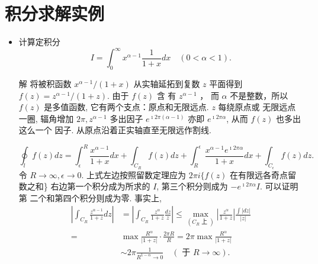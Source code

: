 \section{积分求解实例}

\begin{itemize}
    \item 计算定积分 
    $$
    I=\int_0^{\infty} x^{\alpha-1} \frac{1}{1+x} d x \quad(0<\alpha<1).
    $$

    解 将被积函数 $x^{\alpha-1} /(1+x)$ 从实轴延拓到复数 $z$ 平面得到 
    $f(z)=z^{\alpha-1} /(1+z)$. 由于 $f(z)$ 含 有 $z^{\alpha-1}$ ，
    而 $\alpha$ 不是整数，所以 $f(z)$ 是多值函数, 它有两个支点：原点和无限远点. 
    $z$ 每绕原点或 无限远点一圈, 辐角增加 $2 \pi, z^{\alpha-1}$ 多出因子 
    $e^{\imath 2 \pi(\alpha-1)}$ 亦即 $e^{\imath 2 \pi \alpha}$,
     从而 $f(z)$ 也多出这么一个 因子.
    从原点沿着正实轴直至无限远作割线.   
    
    $$
\oint_l f(z) d z=\int_{\epsilon}^R \frac{x^{\alpha-1}}{1+x} d x+\int_{C_R} f(z) d z+\int_R^{\epsilon} \frac{x^{\alpha-1} e^{\imath 2 \pi \alpha}}{1+x} d x+\int_{C_{\epsilon}} f(z) d z .
$$
令 $R \rightarrow \infty, \epsilon \rightarrow 0$.
 上式左边按照留数定理应为 $2 \pi i\{f(z)$ 在有限远各奇点留数之和\}
  右边第一个积分成为所求的 $I$, 第三个积分则成为 $-e^{\imath 2 \pi \alpha} I$. 
  可以证明第 二个和第四个积分则成为零. 事实上,
  $$
\begin{aligned}
\left|\int_{C_R} \frac{z^{\alpha-1}}{1+z} d z\right| & =\left|\int_{C_R} \frac{z^\alpha}{1+z} \frac{d z}{z}\right| \leqslant \max _{\left(C_R \text { 上 }\right)}\left|\frac{z^\alpha}{1+z}\right| \frac{\int|d z|}{|z|} \\
= & \max \frac{R^\alpha}{|1+z|} \cdot \frac{2 \pi R}{R}=2 \pi \max \frac{R^\alpha}{|1+z|} \\
& \sim 2 \pi \frac{1}{R^{1-\alpha} \rightarrow 0} \quad(\text { 于 } R \rightarrow \infty) .
\end{aligned}
$$


\end{itemize}
